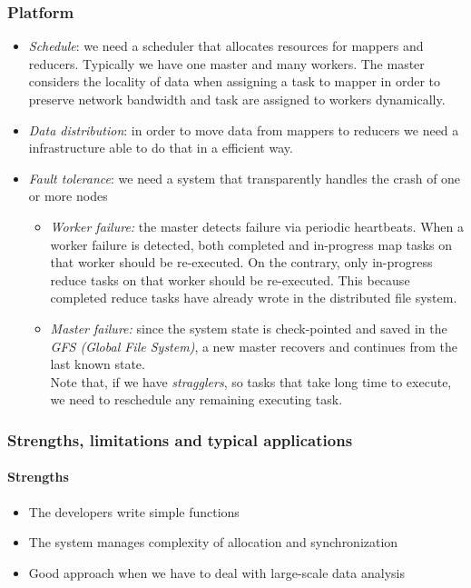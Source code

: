 \subsubsection{Platform}
\begin{itemize}
    \item \textit{Schedule}: we need a scheduler that allocates resources for mappers and reducers. Typically we have one master and many workers. The master considers the locality of data when assigning a task to  mapper in order to preserve network bandwidth and task are assigned to workers dynamically.
    \item \textit{Data distribution}: in order to move data from mappers to reducers we need a infrastructure able to do that in a efficient way.
    \item \textit{Fault tolerance}: we need a system that transparently handles the crash of one or more nodes
    \begin{itemize}
        \item \textit{Worker failure:} the master detects failure via periodic heartbeats. When a worker failure is detected, both completed and in-progress map tasks on that worker should be re-executed. On the contrary, only in-progress reduce tasks on that worker should be re-executed. This because completed reduce tasks have already wrote in the distributed file system.
        \item \textit{Master failure:} since the system state is check-pointed and saved in the \textit{GFS (Global File System)}, a new master recovers and continues from the last known state.\\
        Note that, if we have \textit{stragglers}, so tasks that take long time to execute, we need to reschedule any remaining executing task.
    \end{itemize}
\end{itemize}

\subsubsection{Strengths, limitations and typical applications}
\paragraph{Strengths}
\begin{itemize}
    \item The developers write simple functions
    \item The system manages complexity of allocation and synchronization
    \item Good approach when we have to deal with large-scale data analysis
\end{itemize}

